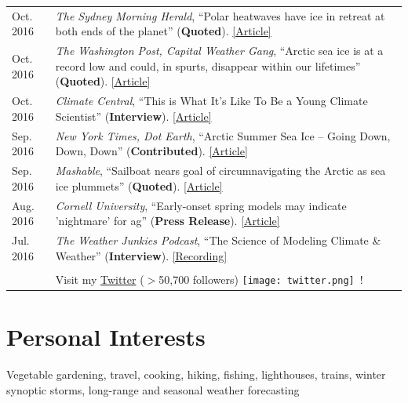 \documentclass[margin,line,palatino,courier,10pt]{res}
\begin{document}
\begin{resume}
\begin{tabular}{@{}p{0.9in}p{4in}}
Oct. 2016 & \textit{The Sydney Morning Herald}, ``Polar heatwaves have ice in retreat at both ends of the planet'' (\textbf{Quoted}). \href{http://www.smh.com.au/environment/climate-change/polar-heatwaves-have-ice-in-retreat-at-both-ends-of-the-planet-20161030-gse9q6.html}{[Article]}\\
Oct. 2016 & \textit{The Washington Post, Capital Weather Gang}, ``Arctic sea ice is at a record low and could, in spurts, disappear within our lifetimes'' (\textbf{Quoted}). \href{https://www.washingtonpost.com/news/capital-weather-gang/wp/2016/10/27/arctic-sea-ice-is-at-a-record-low-and-could-in-spurts-disappear-within-our-lifetimes/}{[Article]}\\
Oct. 2016 & \textit{Climate Central}, ``This is What It's Like To Be a Young Climate Scientist'' (\textbf{Interview}). \href{http://www.climatecentral.org/news/young-climate-scientists-interviews-20799}{[Article]}\\
Sep. 2016 & \textit{New York Times, Dot Earth}, ``Arctic Summer Sea Ice -- Going Down, Down, Down'' (\textbf{Contributed}). \href{http://dotearth.blogs.nytimes.com/2016/09/16/arctic-summer-sea-ice-going-down-down-down/?module=BlogPost-ReadMore&version=Blog\%20Main&action=Click&contentCollection=arctic&pgtype=Blogs&region=Body&_r=1#more-58318}{[Article]}\\
Sep. 2016 & \textit{Mashable}, ``Sailboat nears goal of circumnavigating the Arctic as sea ice plummets'' (\textbf{Quoted}). \href{http://mashable.com/2016/09/01/sailboat-arctic-ice-melt-open-water/#s7nzft8m6sqB}{[Article]}\\
Aug. 2016 & \textit{Cornell University}, ``Early-onset spring models may indicate 'nightmare' for ag'' (\textbf{Press Release}). \href{http://www.news.cornell.edu/stories/2016/08/early-onset-spring-models-may-indicate-nightmare-ag}{[Article]}\\
Jul. 2016 & \textit{The Weather Junkies Podcast}, ``The Science of Modeling Climate \& Weather'' (\textbf{Interview}). \href{https://www.youtube.com/watch?v=vgT5P9zC91U}{[Recording]}\\\\

& Visit my \href{https://twitter.com/ZLabe}{Twitter} ($>$50,700 followers) \texttt{[image: twitter.png]}\ !\\
\end{tabular}

\vspace{-0.1in}
\noindent\textcolor{Cerulean}{\makebox[\linewidth][r]{\rule{\textwidth}{5pt}}}
\vspace{-0.3in}
\section{\sc \textcolor{Cerulean}{\large{\textbf{Personal Interests}}}}
Vegetable gardening, travel, cooking, hiking, fishing, lighthouses, trains, winter synoptic storms, long-range and seasonal weather forecasting

\end{resume}
\end{document}
